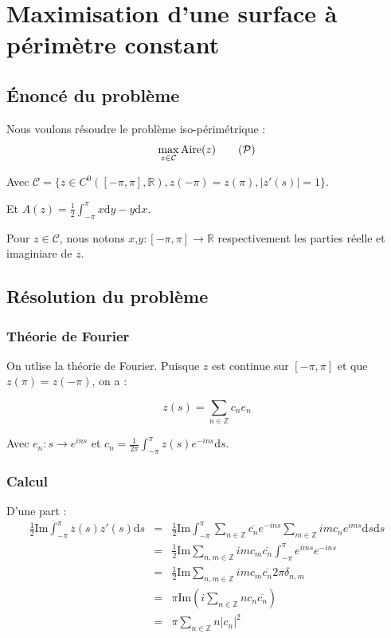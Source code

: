 \documentclass[10pt,a4paper]{article}
\newcommand{\R}{\mathbb{R}}
\newcommand{\Z}{\mathbb{Z}}
\renewcommand{\d}{\mathrm{d}}
\renewcommand{\P}{\mathcal{P}}
\newcommand{\A}{\mathrm{Aire}}
\renewcommand{\Im}{\mathrm{Im}}
\theoremstyle{plain}
\theoremstyle{definition}
\begin{document}
\section{Maximisation d'une surface à périmètre constant}

\subsection{Énoncé du problème}

Nous voulons résoudre le problème iso-périmétrique :
\[\max_{z \in \mathcal{C}} \A(z) \label{eq:p}\tag{$\P$}\]


Avec $\mathcal{C} = \{ z \in C^0([-\pi,\pi], \R), z(-\pi)=z(\pi), |z'(s)|=1 \}$.

Et $A(z) = \frac{1}{2} \int_{-\pi}^{\pi}{x\d y-y\d x}$.


Pour $z\in \mathcal{C}$, nous notons $x$,$y : [-\pi,\pi] \rightarrow \R$ respectivement les parties réelle et imaginiare de $z$.



\subsection[Résolution du problème]{Résolution du problème \cite{fuglede86}}


\subsubsection{Théorie de Fourier}

On utlise la théorie de Fourier. Puisque $z$ est continue sur $[-\pi,\pi]$ et que $z(\pi)=z(-\pi)$, on a :

\[ z(s) = \sum_{n \in \Z}{c_n e_n} \]

Avec $e_n: s \rightarrow e^{ins}$ et $c_n = \frac{1}{2\pi} \int_{-\pi}^{\pi}{z(s)e^{-ins}\d s}$.

\subsubsection{Calcul}

D'une part :
\begin{eqnarray*}
\frac{1}{2} \Im \int_{-\pi}^{\pi}{\overline{z}(s) z'(s) \d s} &=& \frac{1}{2} \Im \int_{-\pi}^{\pi}{ \sum_{n\in \Z}{\overline{c_n} e^{-ins}} \sum_{m\in \Z}{imc_n e^{ims}} \d s}\d s\\
&=& \frac{1}{2} \Im \sum_{n,m\in \Z}{ im c_m \overline{c_n} \int_{-\pi}^{\pi}{e^{ims}e^{-ins}} } \\
&=& \frac{1}{2} \Im \sum_{n,m\in \Z}{ im c_m \overline{c_n} 2\pi \delta_{n,m} } \\
&=& \pi \Im\left( i\sum_{n\in \Z}{ n c_n \overline{c_n}}\right) \\
&=& \pi \sum_{n\in \Z}{ n |c_n|^2}
\end{eqnarray*}
\end{document}
